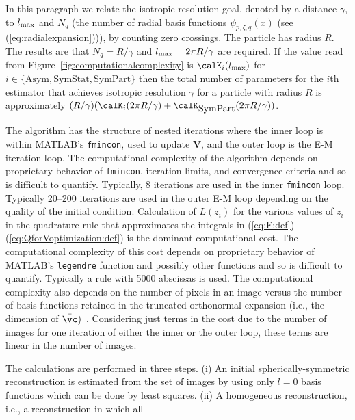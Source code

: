\par
In this paragraph we relate the isotropic resolution goal, denoted by a
distance $\gamma$, to
$l_{\rm max}$ and
$N_q$ (the number of radial basis functions $\psi_{p,\zeta,q}(x)$ (see (\ref{eq:radialexpansion}))), %
by counting zero crossings.
The particle has radius $R$.
The results are that
$N_q=R/\gamma$
and
$l_{\rm max}=2\pi R/\gamma$
are required.
If the value read from Figure~\ref{fig:computationalcomplexity} is
$\calK_i(l_{\rm max})$ for $i\in\{\mbox{Asym},\mbox{SymStat},\mbox{SymPart}\}$
then the total number of parameters for the $i$th estimator that achieves
isotropic resolution $\gamma$ for a particle with radius $R$ is approximately
$(R/\gamma) (\calK_i(2\pi R/\gamma) + \calK_{\mbox{SymPart}}(2\pi
R/\gamma))$.
\par
The algorithm has the structure of nested iterations where the inner
loop is within MATLAB's {\tt fmincon}, used to update $\mathbf{V}$,
and the outer loop is the E-M iteration loop.
The computational complexity of the algorithm depends on proprietary
behavior of {\tt fmincon}, iteration limits, and convergence criteria and
so is difficult to quantify.
Typically, 8 iterations are used in the inner {\tt fmincon} loop.
Typically 20--200 iterations are used in the outer E-M loop depending on
the quality of the initial condition.
Calculation of $L(z_i)$ for the various values of $z_i$ in the quadrature
rule that approximates the integrals in
(\ref{eq:F:def})--(\ref{eq:QforVoptimization:def})
is the dominant computational cost.
The computational complexity of this cost depends on proprietary behavior
of MATLAB's {\tt legendre} function and possibly other functions and so
is difficult to quantify.
Typically a rule with 5000 abscissas is used.
The computational complexity also depends on the number of pixels in an
image versus the number of basis functions retained in the truncated
orthonormal expansion (i.e., the dimension of
$\bar{\vc}$)~\cite[Section~6]{YiliZhengQiuWangDoerschukJOSA2012}.
Considering just terms in the cost due to the number of images for one
iteration of either the inner or the outer loop, these terms are linear
in the number of images.
\par
The calculations are performed in three steps.
(i) An initial spherically-symmetric reconstruction is estimated from the
set of images by using only $l=0$ basis functions which can be done by
least squares.
(ii) A homogeneous reconstruction, i.e., a reconstruction in which all
